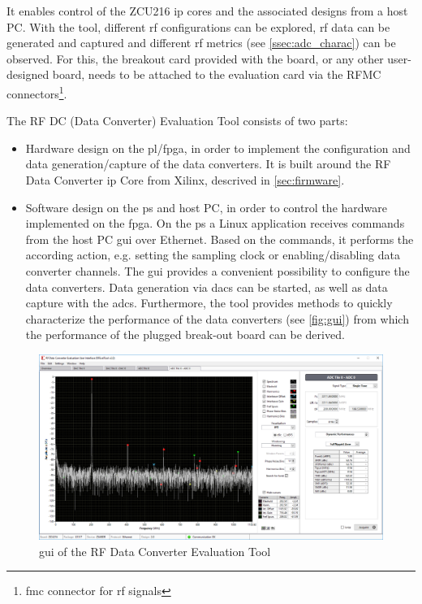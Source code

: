 It enables control of the ZCU216 \gls{ip} cores and the associated designs from a host PC. 
With the tool, different \gls{rf} configurations can be explored, \gls{rf} data can be generated and captured and different \gls{rf} metrics (see \autoref{ssec:adc_charac}) can be observed.  \cite{zcu216evaltool}
For this, the breakout card provided with the board, or any other user-designed board, needs to be attached to the evaluation card via the RFMC connectors\footnote{\gls{fmc} connector for \gls{rf} signals}.

The RF DC (Data Converter) Evaluation Tool consists of two parts:
\begin{itemize}
	\item Hardware design on the \gls{pl}/\gls{fpga}, in order to implement the configuration and data generation/capture of the data converters.
	It is built around the RF Data Converter \gls{ip} Core from Xilinx, descrived in \autoref{sec:firmware}.
	\item Software design on the \gls{ps} and host PC, in order to control the hardware implemented on the \gls{fpga}.
	On the \gls{ps} a Linux application receives commands from the host PC \gls{gui} over Ethernet.
	Based on the commands, it performs the according action, e.g. setting the sampling clock or enabling/disabling data converter channels.
	The \gls{gui} provides a convenient possibility to configure the data converters.
	Data generation via \glspl{dac} can be started, as well as data capture with the \glspl{adc}.
	Furthermore, the tool provides methods to quickly characterize the performance of the data converters (see \autoref{fig:gui}) from which the performance of the plugged break-out board can be derived.
\end{itemize}


\begin{figure}[tb]
	\centering
	\includegraphics[width = \textwidth]{chap/05-readout/img/evaltool}
	\caption{\gls{gui} of the RF Data Converter Evaluation Tool}
	\label{fig:gui}
\end{figure}

